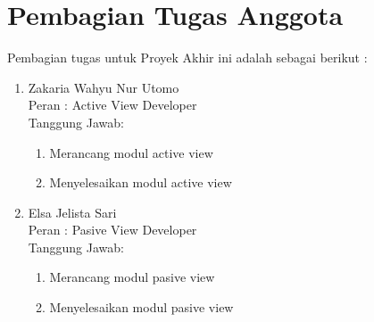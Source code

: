 \section{Pembagian Tugas Anggota}
Pembagian tugas untuk Proyek Akhir ini adalah sebagai berikut :

\begin{enumerate}
	
\item	Zakaria Wahyu Nur Utomo \\
Peran	: Active View Developer \\
Tanggung Jawab:
\begin{enumerate}
\item	Merancang modul active view
\item	Menyelesaikan modul active view
\end{enumerate}
\item	Elsa Jelista Sari  \\
Peran	: Pasive View Developer \\
Tanggung Jawab: 
\begin{enumerate}
\item	Merancang modul pasive view
\item	Menyelesaikan modul pasive view
\end{enumerate}

\end{enumerate}